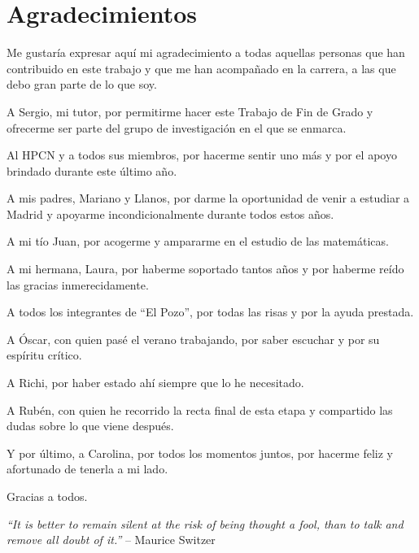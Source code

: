 \chapter*{Agradecimientos}

\noindent
Me gustaría expresar aquí mi agradecimiento a todas aquellas personas que han contribuido en este trabajo y que me han acompañado en la carrera, a las que debo gran parte de lo que soy.

\noindent
A Sergio, mi tutor, por permitirme hacer este Trabajo de Fin de Grado y ofrecerme ser parte del grupo de investigación en el que se enmarca.

\noindent
Al HPCN y a todos sus miembros, por hacerme sentir uno más y por el apoyo brindado durante este último año.

\noindent
A mis padres, Mariano y Llanos, por darme la oportunidad de venir a estudiar a Madrid y apoyarme incondicionalmente durante todos estos años.

\noindent
A mi tío Juan, por acogerme y ampararme en el estudio de las matemáticas.

\noindent
A mi hermana, Laura, por haberme soportado tantos años y por haberme reído las gracias inmerecidamente.

\noindent
A todos los integrantes de ``El Pozo'', por todas las risas y por la ayuda prestada.

\noindent
A Óscar, con quien pasé el verano trabajando, por saber escuchar y por su espíritu crítico.

\noindent
A Richi, por haber estado ahí siempre que lo he necesitado.

\noindent
A Rubén, con quien he recorrido la recta final de esta etapa y compartido las dudas sobre lo que viene después.

\noindent
Y por último, a Carolina, por todos los momentos juntos, por hacerme feliz y afortunado de tenerla a mi lado.

\noindent
Gracias a todos.

\begin{flushright}
\textit{``It is better to remain silent at the risk of being thought a fool, than to talk and remove all doubt of it.''}
-- Maurice Switzer
\end{flushright}

